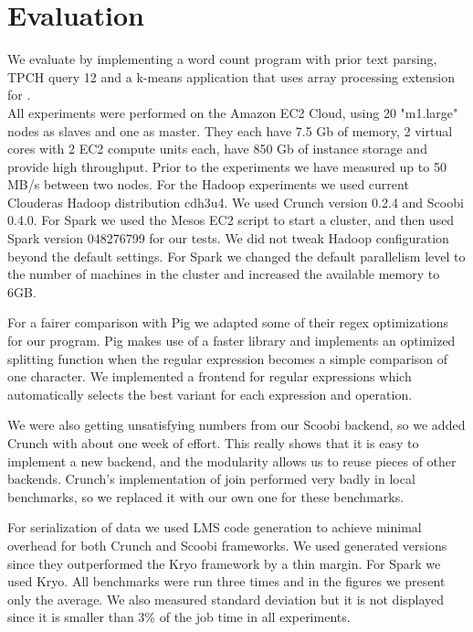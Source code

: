 \section{Evaluation}
\label{sec:evaluation}


We evaluate \tool by implementing a word count program with prior text parsing, TPCH query 12 and a k-means application that uses array processing extension for \tool. \\

All experiments were performed on the Amazon EC2 Cloud, using 20 "m1.large" nodes as slaves and one as master. They each have 7.5 Gb of memory, 2 virtual cores with 2 EC2 compute units each, have 850 Gb of instance storage and provide high throughput. Prior to the experiments we have measured up to 50 MB/s between two nodes. For the Hadoop experiments we used current Clouderas Hadoop distribution cdh3u4. We used Crunch version 0.2.4 and Scoobi 0.4.0. For Spark we used the Mesos  EC2 script to start a cluster, and then used Spark version 048276799 for our tests. We did not tweak Hadoop configuration beyond the default settings. For Spark we changed the default parallelism level to the number of machines in the cluster and increased the available memory to 6GB. 

For a fairer comparison with Pig we adapted some of their regex optimizations for our program. Pig makes use of a faster library  and implements an optimized splitting function when the regular expression becomes a simple comparison of one character. We implemented a frontend for regular expressions which automatically selects the best variant for each expression and operation. 

We were also getting unsatisfying numbers from our Scoobi backend, so we added Crunch with about one week of effort. This really shows that it is easy to implement a new backend, and the modularity allows us to reuse pieces of other backends. Crunch's implementation of join performed very badly in local benchmarks, so we replaced it with our own one for these benchmarks.

For serialization of data we used LMS code generation to achieve minimal overhead for both Crunch and Scoobi frameworks. We used generated versions since they outperformed the Kryo framework by a thin margin. For Spark we used Kryo. All benchmarks were run three times and in the figures we present only the average. We also measured standard deviation but it is not displayed since it is smaller than 3\% of the job time in all experiments.


